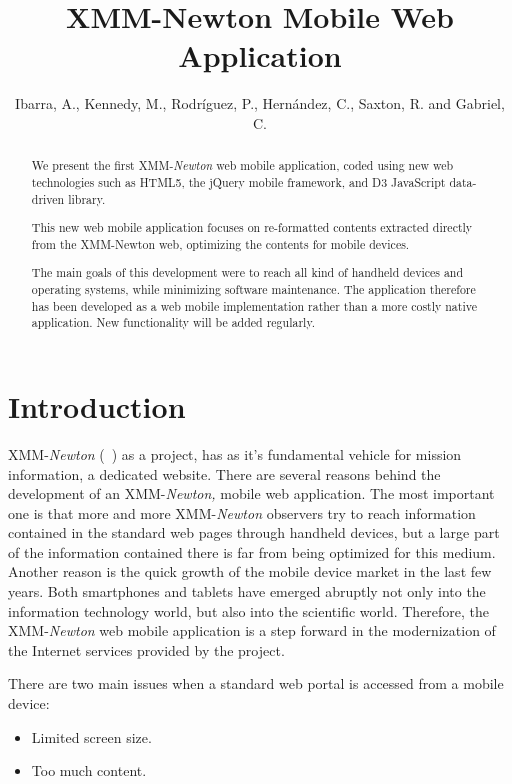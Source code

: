 
\resetcounters




\title{XMM-Newton Mobile Web Application}
\author{Ibarra, A., Kennedy, M., Rodr\'iguez, P., Hern\'andez, C., Saxton, R. and Gabriel, C.}

\begin{abstract}
We present the first XMM-{\em Newton} web mobile application, coded using new web
technologies such as HTML5, the jQuery mobile framework, and D3
JavaScript data-driven library.

This new web mobile application focuses on re-formatted contents
extracted directly from the XMM-Newton web, optimizing the contents for
mobile devices. 

The main goals of this development were to reach all kind of handheld
devices and operating systems, while minimizing software
maintenance. The application therefore has been developed as a web mobile
implementation rather than a more costly native application. New
functionality will be added regularly.

\end{abstract}

\section{Introduction}

XMM-{\em Newton} (~\cite{Jansen}) as a project, has as it's fundamental vehicle
for mission information, a dedicated website. There are several
reasons behind the development of an XMM-{\em Newton,} mobile web application. The
most important one is that more and more XMM-{\em Newton} observers try to reach
information contained in the standard web pages through handheld
devices, but a large part of the information contained there is far
from being optimized for this medium. Another reason is the quick
growth of the mobile device market in the last few years.  Both
smartphones and tablets have emerged abruptly not only into the
information technology world, but also into the scientific
world. Therefore, the XMM-{\em Newton} web mobile application is a step forward in
the modernization of the Internet services provided by the project.
 
There are two main issues when a standard web portal is accessed from a mobile device:
\begin{itemize}
\item Limited screen size.
\item Too much content.
\end{itemize}

